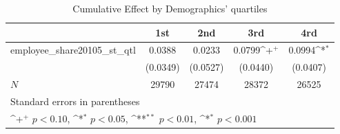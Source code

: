 \begin{table}[htbp]\centering
\def\sym#1{\ifmmode^{#1}\else\(^{#1}\)\fi}
\caption{Cumulative Effect by Demographics' quartiles}
\begin{tabular}{l*{4}{c}}
\hline\hline
            &\multicolumn{1}{c}{1st}&\multicolumn{1}{c}{2nd}&\multicolumn{1}{c}{3rd}&\multicolumn{1}{c}{4rd}\\
\hline
employee\_share20105\_st\_qtl&      0.0388       &      0.0233       &      0.0799\sym{+}&      0.0994\sym{*}\\
            &    (0.0349)       &    (0.0527)       &    (0.0440)       &    (0.0407)       \\
\hline
\(N\)       &       29790       &       27474       &       28372       &       26525       \\
\hline\hline
\multicolumn{5}{l}{\footnotesize Standard errors in parentheses}\\
\multicolumn{5}{l}{\footnotesize \sym{+} \(p<0.10\), \sym{*} \(p<0.05\), \sym{**} \(p<0.01\), \sym{*} \(p<0.001\)}\\
\end{tabular}
\end{table}
